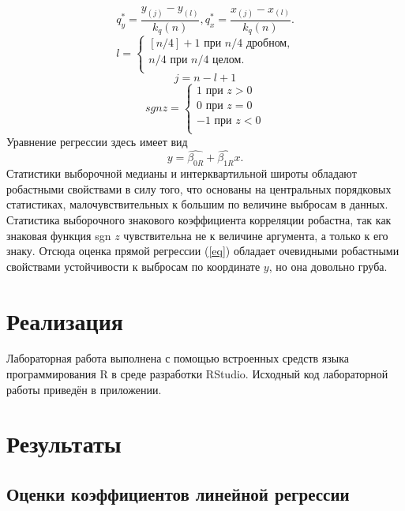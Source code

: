 \begin{equation}
q_y^\ast=\frac{y_{(j)}-y_{(l)}}{k_q(n)}, q_x^\ast=\frac{x_{(j)}-x_{(l)}}{k_q(n)}. 
\end{equation}
\begin{equation}
l=
\begin{cases}
[n/4]+1 \text{ при } n/4 \text{ дробном,}\\
n/4 \text{ при } n/4 \text{ целом}.\\
\end{cases}
\end{equation}
\begin{equation}
j=n-l+1
\end{equation}
\begin{equation}
sgn z =
\begin{cases}
1 \text{ при } z>0\\
0 \text{ при } z=0\\
-1 \text{ при } z<0\\
\end{cases}
\end{equation}
Уравнение регрессии здесь имеет вид
\begin{equation} \label{eq}
y=\widehat{\beta_{0R}}+\widehat{\beta_{1R}}x.
\end{equation}
Статистики выборочной медианы и интерквартильной широты обладают робастными свойствами в силу того, что основаны на центральных порядковых статистиках, малочувствительных к большим по величине выбросам в данных. Статистика выборочного знакового коэффициента корреляции робастна, так как знаковая функция sgn $z$ чувствительна не к величине аргумента, а только к его знаку. Отсюда оценка прямой регрессии (\ref{eq}) обладает очевидными робастными свойствами устойчивости к выбросам по координате $y$, но она довольно груба.


\section{Реализация}
Лабораторная работа выполнена с помощью встроенных средств языка программирования R в среде разработки RStudio. Исходный код лабораторной работы приведён в приложении.

\section{Результаты}
\subsection{Оценки коэффициентов линейной регрессии}
